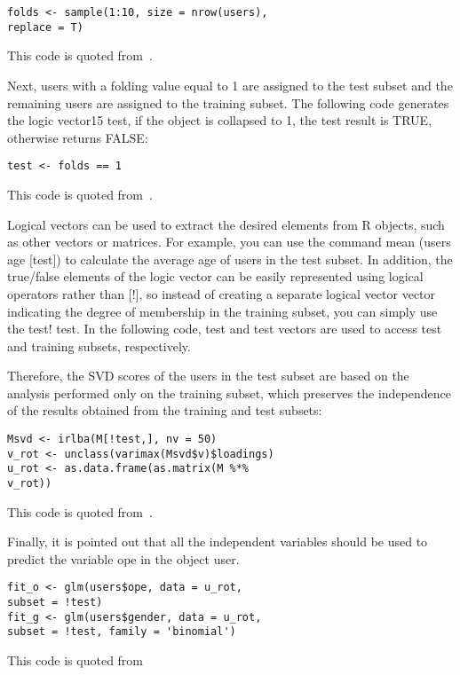 \begin{verbatim}
folds <- sample(1:10, size = nrow(users),
replace = T)
\end{verbatim}

This code is quoted from~\cite{editor12}.

Next, users with a folding value equal to 1 are assigned to the 
test subset and the remaining users are assigned to the training 
subset. The following code generates the logic vector15 test, if 
the object is collapsed to 1, the test result is TRUE, otherwise 
returns FALSE:

\begin{verbatim}
test <- folds == 1
\end{verbatim}

This code is quoted from~\cite{editor12}.

Logical vectors can be used to extract the desired elements from R
 objects, such as other vectors or matrices. For example, you can 
use the command mean (users age [test]) to calculate the average age
 of users in the test subset. In addition, the true/false elements
 of the logic vector can be easily represented using logical 
operators rather than [!], so instead of creating a separate 
logical vector vector indicating the degree of membership in the 
training subset, you can simply use the test! test. In the 
following code, test and test vectors are used to access test and 
training subsets, respectively.

Therefore, the SVD scores of the users in the test subset are based
 on the analysis performed only on the training subset, which 
preserves the independence of the results obtained from the 
training and test subsets:

\begin{verbatim}
Msvd <- irlba(M[!test,], nv = 50)
v_rot <- unclass(varimax(Msvd$v)$loadings)
u_rot <- as.data.frame(as.matrix(M %*%
v_rot))
\end{verbatim}

This code is quoted from~\cite{editor12}.

Finally, it is pointed out that all the independent variables 
should be used to predict the variable ope in the object user.

\begin{verbatim}
fit_o <- glm(users$ope, data = u_rot,
subset = !test)
fit_g <- glm(users$gender, data = u_rot,
subset = !test, family = 'binomial')
\end{verbatim}

This code is quoted from~\cite{editor12}

